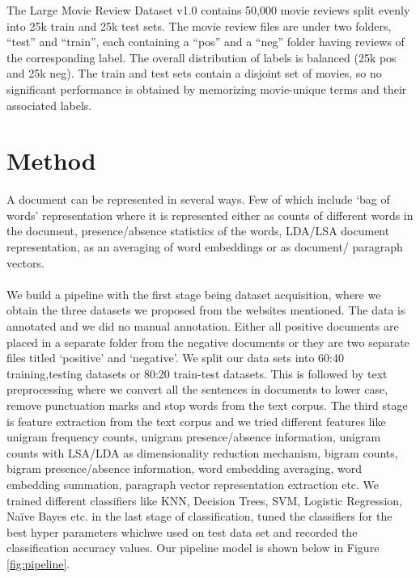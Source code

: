 \documentclass[a4paper,26pt]{article}
\begin{document}
The Large Movie Review Dataset v1.0 contains 50,000 movie reviews split evenly into 25k train and 25k test sets. The movie review files are under two folders, ``test'' and ``train'', each containing a ``pos'' and a ``neg'' folder having reviews of the corresponding label. The overall distribution of labels is balanced (25k pos and 25k neg). The train and test sets contain a disjoint set of movies, so no significant performance is obtained by memorizing movie-unique terms and their associated labels.

\section{Method}
A document can be represented in several ways. Few of which include `bag of words' representation where it is represented either as counts of different words in the document, presence/absence statistics of the words, LDA/LSA document representation, as an averaging of word embeddings or as document/ paragraph vectors.

\paragraph{}
We build a pipeline with the first stage being dataset acquisition, where we obtain the three datasets we proposed from the websites mentioned. The data is annotated and we did no manual annotation. Either all positive documents are placed in a separate folder from the negative documents or they are two separate files titled `positive' and `negative'. We split our data sets into 60:40 training,testing datasets or 80:20 train-test datasets. This is followed by text preprocessing where we convert all the sentences in documents to lower case, remove punctuation marks and stop words from the text corpus. The third stage is feature extraction from the text corpus and we tried different features like unigram frequency counts, unigram presence/absence information, unigram counts with LSA/LDA as dimensionality reduction mechanism, bigram counts, bigram presence/absence information, word embedding averaging, word embedding summation, paragraph vector representation extraction etc. We trained different classifiers like KNN, Decision Trees, SVM, Logistic Regression, Naïve Bayes etc. in the last stage of classification, tuned the classifiers for the best hyper parameters whichwe used on test data set and recorded the classification accuracy values. 
Our pipeline model is shown below in Figure \ref{fig:pipeline}.
\end{document}
